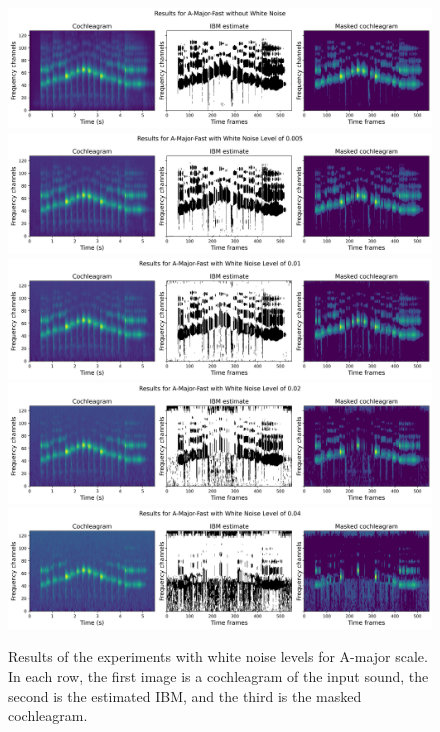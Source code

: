 \begin{figure}[htp]
	\centering
	\includegraphics[width=\textwidth]{include/experiments_A-major-fast_WN_0,0.jpg}
	\includegraphics[width=\textwidth]{include/experiments_A-major-fast_WN_0,005.jpg}
	\includegraphics[width=\textwidth]{include/experiments_A-major-fast_WN_0,01.jpg}
	\includegraphics[width=\textwidth]{include/experiments_A-major-fast_WN_0,02.jpg}
	\includegraphics[width=\textwidth]{include/experiments_A-major-fast_WN_0,04.jpg}
	\caption[Results of experiments with white noise levels]{Results of the experiments with white noise levels for A-major scale. In each row, the first image is a cochleagram of the input sound, the second is the estimated IBM, and the third is the masked cochleagram.}
	\label{img:white_noise_experiments}
\end{figure}

